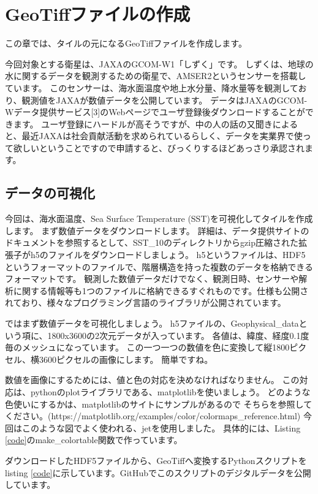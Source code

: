 \chapter*{GeoTiffファイルの作成}

この章では、タイルの元になるGeoTiffファイルを作成します。

今回対象とする衛星は、JAXAのGCOM-W1「しずく」です。
しずくは、地球の水に関するデータを観測するための衛星で、AMSER2というセンサーを搭載しています。
このセンサーは、海水面温度や地上水分量、降水量等を観測しており、観測値をJAXAが数値データを公開しています。
データはJAXAのGCOM-Wデータ提供サービス[3]のWebページでユーザ登録後ダウンロードすることができます。
ユーザ登録にハードルが高そうですが、中の人の話の又聞きによると、最近JAXAは社会貢献活動を求められているらしく、データを実業界で使って欲しいということですので申請すると、びっくりするほどあっさり承認されます。

\section*{データの可視化}
今回は、海水面温度、Sea Surface Temperature (SST)を可視化してタイルを作成します。
まず数値データをダウンロードします。
詳細は、データ提供サイトのドキュメントを参照するとして、SST\_10のディレクトリからgzip圧縮された拡張子がh5のファイルをダウンロードしましょう。
h5というファイルは、HDF5というフォーマットのファイルで、階層構造を持った複数のデータを格納できるフォーマットです。
観測した数値データだけでなく、観測日時、センサーや解析に関する情報等も1つのファイルに格納できるすぐれものです。仕様も公開されており、様々なプログラミング言語のライブラリが公開されています。

ではまず数値データを可視化しましょう。
h5ファイルの、Geophysical\_dataという項に、1800x3600の2次元データが入っています。
各値は、緯度、経度0.1度毎のメッシュになっています。
この一つ一つの数値を色に変換して縦1800ピクセル、横3600ピクセルの画像にします。
簡単ですね。

数値を画像にするためには、値と色の対応を決めなければなりません。
この対応は、pythonのplotライブラリである、matplotlibを使いましょう。
どのような色使いにするかは、matplotlibのサイトにサンプルがあるので
そちらを参照してください。(https://matplotlib.org/examples/color/colormaps\_reference.html) 今回はこのような図でよく使われる、jetを使用しました。
具体的には、Listing \ref{code}のmake\_colortable関数で作っています。

ダウンロードしたHDF5ファイルから、GeoTiffへ変換するPythonスクリプトをlisting \ref{code}に示しています。GitHubでこのスクリプトのデジタルデータを公開しています。

